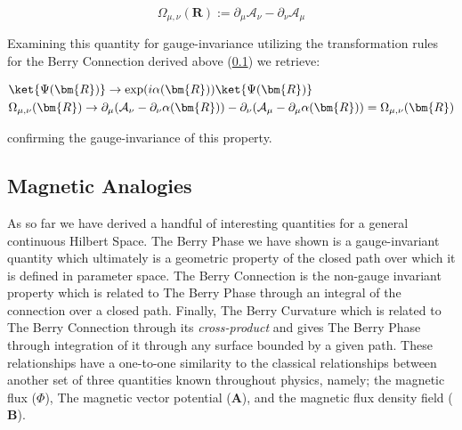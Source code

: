\documentclass{article}
\begin{document}
  \begin{equation*}
    \Omega_{\mu, \nu}(\bm{R}) := \partial_{\mu} \mathcal{A}_{\nu} - \partial_{\nu} \mathcal{A}_{\mu}  
  \end{equation*}

Examining this quantity for gauge-invariance utilizing the transformation rules for the Berry Connection derived above (\ref{}) we retrieve:


       \begin{align*}
         &\ket{\Psi(\bm{R})} \rightarrow \exp(i\alpha(\bm{R}))\ket{\Psi(\bm{R})}\\
         &\Omega_{\mu, \nu}(\bm{R}) \rightarrow \partial_{\mu} (\mathcal{A}_{\nu}
         - \partial_{\nu} \alpha(\bm{R})) - \partial_{\nu}(\mathcal{A}_{\mu} -
         \partial_{\mu} \alpha(\bm{R})) = \Omega_{\mu, \nu}(\bm{R})
      \end{align*}

confirming the gauge-invariance of this property.

\subsection{Magnetic Analogies}

As so far we have derived a handful of interesting quantities for a general continuous Hilbert Space. The Berry Phase we have shown is a gauge-invariant quantity which ultimately is a geometric property of the closed path over which it is defined in parameter space. The Berry Connection is the non-gauge invariant property which is related to The Berry Phase through an integral of the connection over a closed path. Finally, The Berry Curvature which is related to The Berry Connection through its \textit{cross-product} and gives The Berry Phase through integration of it through any surface bounded by a given path. These relationships have a one-to-one similarity to the classical relationships between another set of three quantities known throughout physics, namely; the magnetic flux ($\Phi$), The magnetic vector potential ($\bm{A}$), and the magnetic flux density field ($\bm{B}$).
\end{document}
